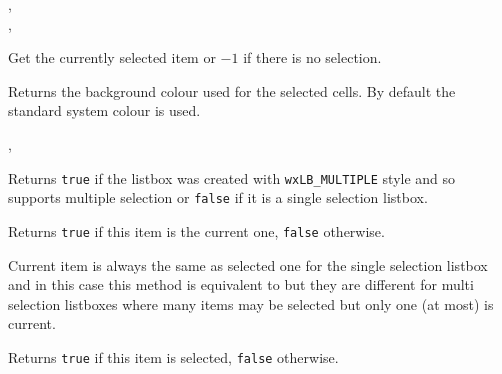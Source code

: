 
,\\
,\\


\label{wxvlistboxgetselection}


Get the currently selected item or $-1$ if there is no selection.


\label{wxvlistboxgetselectionbackground}


Returns the background colour used for the selected cells. By default the
standard system colour is used.


,\\


\label{wxvlistboxishasmultipleselection}


Returns {\tt true} if the listbox was created with {\tt wxLB\_MULTIPLE} style
and so supports multiple selection or {\tt false} if it is a single selection
listbox.


\label{wxvlistboxiscurrent}


Returns {\tt true} if this item is the current one, {\tt false} otherwise.

Current item is always the same as selected one for the single selection
listbox and in this case this method is equivalent to 
 but they are different for multi
selection listboxes where many items may be selected but only one (at most) is
current.


\label{wxvlistboxisselected}


Returns {\tt true} if this item is selected, {\tt false} otherwise.



